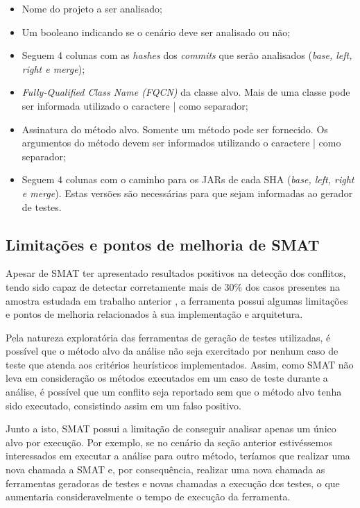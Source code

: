\documentclass[12pt]{article}
\begin{document}
\begin{itemize}
    \item Nome do projeto a ser analisado;
    \item Um booleano indicando se o cenário deve ser analisado ou não;
    \item Seguem 4 colunas com as \textit{hashes} dos \textit{commits} que serão analisados (\textit{base, left, right e merge});
    \item \textit{Fully-Qualified Class Name (FQCN)} da classe alvo. Mais de uma classe pode ser informada utilizado o caractere | como separador;
    \item Assinatura do método alvo. Somente um método pode ser fornecido. Os argumentos do método devem ser informados utilizando o caractere | como separador;
    \item Seguem 4 colunas com o caminho para os JARs de cada SHA (\textit{base, left, right e merge}). Estas versões são necessárias para que sejam informadas ao gerador de testes.
\end{itemize}

\subsection{Limitações e pontos de melhoria de SMAT}
Apesar de SMAT ter apresentado resultados positivos na detecção dos conflitos, tendo sido capaz de detectar corretamente mais de 30\% dos casos presentes na amostra estudada em trabalho anterior \cite{leuson:icsme}, a ferramenta possui algumas limitações e pontos de melhoria relacionados à sua implementação e arquitetura.

Pela natureza exploratória das ferramentas de geração de testes utilizadas, é possível que o método alvo da análise não seja exercitado por nenhum caso de teste que atenda aos critérios heurísticos implementados. Assim, como SMAT não leva em consideração os métodos executados em um caso de teste durante a análise, é possível que um conflito seja reportado sem que o método alvo tenha sido executado, consistindo assim em um falso positivo.

Junto a isto, SMAT possui a limitação de conseguir analisar apenas um único alvo por execução. Por exemplo, se no cenário da seção anterior estivéssemos interessados em executar a análise para outro método, teríamos que realizar uma nova chamada a SMAT e, por consequência, realizar uma nova chamada as ferramentas geradoras de testes e novas chamadas a execução dos testes, o que aumentaria consideravelmente o tempo de execução da ferramenta.
\end{document}
